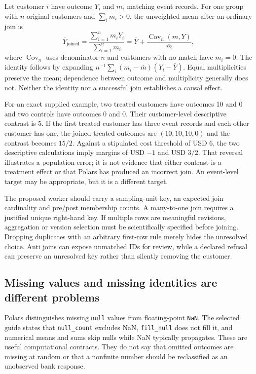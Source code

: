 Let customer $i$ have outcome $Y_i$ and $m_i$ matching event records. For
one group with $n$ original customers and $\sum_i m_i>0$, the unweighted
mean after an ordinary join is
\begin{equation}
 \overline Y_{\mathrm{joined}}
 =\frac{\sum_{i=1}^n m_iY_i}{\sum_{i=1}^n m_i}
 =\overline Y+\frac{\operatorname{Cov}_n(m,Y)}{\overline m},
 \label{eq:exec23-polars-fanout}
\end{equation}
where $\operatorname{Cov}_n$ uses denominator $n$ and customers with no
match have $m_i=0$. The identity follows by expanding
$n^{-1}\sum_i(m_i-\overline m)(Y_i-\overline Y)$. Equal multiplicities
preserve the mean; dependence between outcome and multiplicity generally
does not. Neither the identity nor a successful join establishes a causal
effect.~\citep{exec23_polars_reference}

For an exact supplied example, two treated customers have outcomes 10 and
0 and two controls have outcomes 0 and 0. Their customer-level descriptive
contrast is 5. If the first treated customer has three event records and
each other customer has one, the joined treated outcomes are
$(10,10,10,0)$ and the contrast becomes $15/2$. Against a stipulated
cost threshold of USD 6, the two descriptive calculations imply margins
of USD $-1$ and USD $3/2$. That reversal illustrates a population error;
it is not evidence that either contrast is a treatment effect or that
Polars has produced an incorrect join. An event-level target may be
appropriate, but it is a different target.~\citep{exec23_polars_reference}

The proposed worker should carry a sampling-unit key, an expected join
cardinality and pre/post membership counts. A many-to-one join requires a
justified unique right-hand key. If multiple rows are meaningful revisions,
aggregation or version selection must be scientifically specified before
joining. Dropping duplicates with an arbitrary first-row rule merely
hides the unresolved choice. Anti joins can expose unmatched IDs for
review, while a declared refusal can preserve an unresolved key rather
than silently removing the customer.

\subsection{Missing values and missing identities are different problems}

Polars distinguishes missing \texttt{null} values from floating-point
\texttt{NaN}. The selected guide states that \texttt{null\_count} excludes
NaN, \texttt{fill\_null} does not fill it, and numerical means and sums
skip nulls while NaN typically propagates. These are useful computational
contracts. They do not say that omitted outcomes are missing at random or
that a nonfinite number should be reclassified as an unobserved bank
response.~\citep{exec23_polars_sources}

